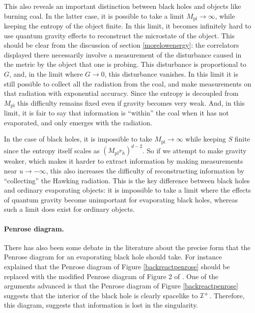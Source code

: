 \documentclass[12pt]{article}
\def\gnewt{G}
\def \scrip{{\cal I}^{+}}
\begin{document}
This also reveals  an important distinction between black holes and objects like burning coal. In the latter case, it is possible to take a limit $M_{\text{pl}} \rightarrow \infty$, while keeping the entropy of the object finite. In this limit, it becomes infinitely hard to use quantum gravity effects to reconstruct the microstate of the object. This should be clear from the discussion of section \ref{morelowenergy}: the correlators displayed there necessarily involve a measurement of the disturbance caused in the metric by the object that one is probing. This disturbance is proportional to $\gnewt$, and, in the limit where $\gnewt \rightarrow 0$, this disturbance vanishes. In this limit it is still possible to collect all the radiation from the coal, and make measurements on that radiation with exponential accuracy. Since the entropy is decoupled from $M_{\text{pl}}$ this difficulty remains fixed even
if gravity becomes very weak. And, in this limit, it is fair to say that information is ``within'' the coal when it has not evaporated, and only emerges with the radiation.

In the case of black holes, it is impossible to take $M_{\text{pl}} \rightarrow \infty$ while keeping $S$ finite since the entropy itself scales as $(M_{\text{pl}} r_h)^{d-2}$. So if we attempt to make gravity weaker, which makes
it harder to extract information by making measurements near $u \rightarrow -\infty$,  this also increases the difficulty of reconstructing information by ``collecting'' the Hawking radiation. This is the key difference between black holes and ordinary evaporating objects: it is impossible to take a limit where the effects of quantum gravity become unimportant for evaporating black holes, whereas such a limit does exist for ordinary objects.




\paragraph{Penrose diagram.}
There has also been some debate in the literature about the precise form that the Penrose diagram for an evaporating black hole should take. For instance \cite{Ashtekar:2020ifw} explained that the Penrose diagram of Figure \ref{backreactpenrose} should be replaced with the modified  Penrose diagram of Figure 2 of \cite{Ashtekar:2020ifw}.  One of the arguments advanced is that the Penrose diagram of Figure \ref{backreactpenrose} suggests that the interior of the black hole
is clearly spacelike to $\scrip$. Therefore, this diagram, suggests that information is lost in the singularity.
\end{document}
